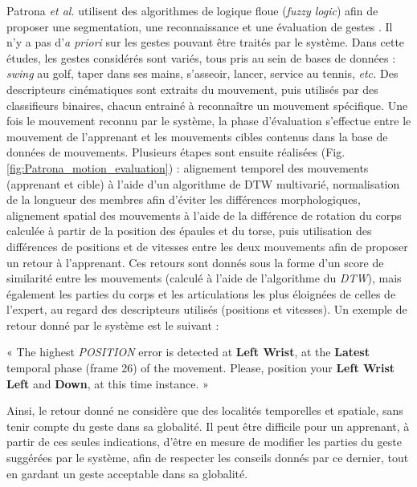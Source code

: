 Patrona \textit{et al.} utilisent des algorithmes de logique floue (\textit{fuzzy logic}) afin de proposer une segmentation, une reconnaissance et une évaluation de gestes \parencite{Patrona2018MaA}. Il n'y a pas d'\textit{a priori} sur les gestes pouvant être traités par le système. Dans cette études, les gestes considérés sont variés, tous pris au sein de bases de données : \textit{swing} au golf, taper dans ses mains, s'asseoir, lancer, service au tennis, \textit{etc.} Des descripteurs cinématiques sont extraits du mouvement, puis utilisés par des classifieurs binaires, chacun entrainé à reconnaître un mouvement spécifique. Une fois le mouvement reconnu par le système, la phase d'évaluation s'effectue entre le mouvement de l'apprenant et les mouvements cibles contenus dans la base de données de mouvements. Plusieurs étapes sont ensuite réalisées (Fig. \ref{fig:Patrona_motion_evaluation}) : alignement temporel des mouvements (apprenant et cible) à l'aide d'un algorithme de DTW multivarié, normalisation de la longueur des membres afin d'éviter les différences morphologiques, alignement spatial des mouvements à l'aide de la différence de rotation du corps calculée à partir de la position des épaules et du torse, puis utilisation des différences de positions et de vitesses entre les deux mouvements afin de proposer un retour à l'apprenant. Ces retours sont donnés sous la forme d'un score de similarité entre les mouvements (calculé à l'aide de l'algorithme du \textit{DTW}), mais également les parties du corps et les articulations les plus éloignées de celles de l'expert, au regard des descripteurs utilisés (positions et vitesses). Un exemple de retour donné par le système est le suivant :

\vspace{0.5cm}« The highest \textit{POSITION} error is detected at \textbf{Left Wrist}, at the \textbf{Latest} temporal phase (frame 26) of the movement. Please, position your \textbf{Left Wrist Left} and \textbf{Down}, at this time instance. »

Ainsi, le retour donné ne considère que des localités temporelles et spatiale, sans tenir compte du geste dans sa globalité. Il peut être difficile pour un apprenant, à partir de ces seules indications, d'être en mesure de modifier les parties du geste suggérées par le système, afin de respecter les conseils donnés par ce dernier, tout en gardant un geste acceptable dans sa globalité.

